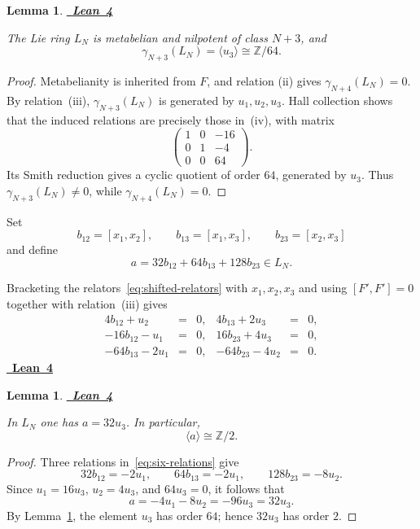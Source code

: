 \documentclass[a4paper,11pt,reqno]{amsart}
\newtheorem{lemma}[theorem]{Lemma}
\theoremstyle{definition}
\newcommand{\leanrepository}{%
  https://github.com/TimmPeterson/lie-algebras/blob/main}
\newcommand{\leanproof}[1]{%
  \leavevmode\unskip\nobreak\hfill
  \mbox{\href{#1}{\normalfont\sffamily\bfseries\footnotesize
    \textcolor{leanblue}{Lean 4}}}%
  \par\nobreak\smallskip\noindent\ignorespaces
}
\newcommand{\Z}{\mathbb Z}
\begin{document}
\begin{lemma}\label{lem:top-layer}
\leanproof{\leanrepository/LieRings/Publication/Results.lean\#L98-L134}
The Lie ring $L_N$ is metabelian and nilpotent of class $N+3$, and
\[
             \gamma_{N+3}(L_N)=\langle u_3\rangle\cong\Z/64.
\]
\end{lemma}

\begin{proof}
Metabelianity is inherited from $F$, and relation (ii) gives
$\gamma_{N+4}(L_N)=0$.  By relation~\textup{(iii)},
$\gamma_{N+3}(L_N)$ is generated by $u_1,u_2,u_3$.  Hall collection shows
that the induced relations are precisely those in~\textup{(iv)}, with
matrix
\[
 \begin{pmatrix}
  1&0&-16\\
  0&1&-4\\
  0&0&64
 \end{pmatrix}.
\]
Its Smith reduction gives a cyclic quotient of order $64$, generated by
$u_3$.  Thus $\gamma_{N+3}(L_N)\neq0$, while
$\gamma_{N+4}(L_N)=0$.
\end{proof}

Set
\[
 b_{12}=[x_1,x_2],
 \qquad
 b_{13}=[x_1,x_3],
 \qquad
 b_{23}=[x_2,x_3]
\]
and define
\begin{equation}\label{eq:a-definition}
                 a=32b_{12}+64b_{13}+128b_{23}\in L_N.
\end{equation}

Bracketing the relators~\eqref{eq:shifted-relators} with $x_1,x_2,x_3$ and
using $[F',F']=0$ together with relation~\textup{(iii)} gives
\begin{equation}\label{eq:six-relations}
 \begin{array}{rclrcl}
 4b_{12}+u_2&=&0,& 4b_{13}+2u_3&=&0,\\
 -16b_{12}-u_1&=&0,&16b_{23}+4u_3&=&0,\\
 -64b_{13}-2u_1&=&0,&-64b_{23}-4u_2&=&0.
 \end{array}
\end{equation}
\leanproof{\leanrepository/LieRings/Publication/Results.lean\#L136-L154}

\begin{lemma}\label{lem:a-order}
\leanproof{\leanrepository/LieRings/Publication/Results.lean\#L156-L165}
In $L_N$ one has $a=32u_3$.  In particular,
\[
                         \langle a\rangle\cong\Z/2.
\]
\end{lemma}

\begin{proof}
Three relations in~\eqref{eq:six-relations} give
\[
 32b_{12}=-2u_1,
 \qquad
 64b_{13}=-2u_1,
 \qquad
 128b_{23}=-8u_2.
\]
Since $u_1=16u_3$, $u_2=4u_3$, and $64u_3=0$, it follows that
\[
 a=-4u_1-8u_2=-96u_3=32u_3.
\]
By Lemma~\ref{lem:top-layer}, the element $u_3$ has order $64$; hence
$32u_3$ has order $2$.
\end{proof}
\end{document}
